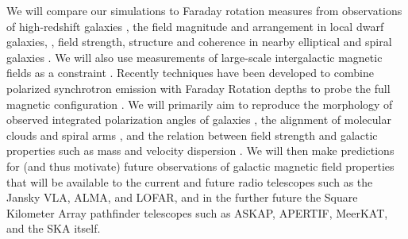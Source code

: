 We will compare our simulations to Faraday rotation measures from
observations of high-redshift galaxies
\cite{2008Natur.454..302B,2008ApJ...676...70K,1998A&A...329..809A},
the field magnitude and arrangement in local dwarf galaxies,
\cite{2000A&A...355..128C,2011A&A...529A..94C,2012MNRAS.423L.127R,Mao12,2013MNRAS.435..149N,2014A&A...567A.134J},
field strength, structure and coherence in nearby elliptical
\cite{1993A&ARv...4..449W,1996MNRAS.279..229M} and spiral galaxies
\cite{2014arXiv1411.1386V}.  We will also use measurements of
large-scale intergalactic magnetic fields as a constraint
\cite{2010Sci...328...73N}.   
Recently techniques have been developed to combine polarized synchrotron
emission with Faraday Rotation depths to probe the full magnetic configuration
\citep{Heald09, Mao15}.
We will primarily aim to reproduce the morphology of observed integrated
polarization angles of galaxies \citep{Stil09}, the alignment of molecular
clouds and spiral arms \citep{2011Natur.479..499L}, and the relation between
field strength and galactic properties such as mass and velocity dispersion
\citep{2014arXiv1411.1386V,Tabatabaei16}.
We will then make predictions for (and thus
motivate) future observations of galactic magnetic field properties that will be
available to the current and future radio telescopes such as the Jansky VLA, ALMA, and LOFAR, and in the
further future the Square Kilometer Array pathfinder telescopes such
as ASKAP, APERTIF, MeerKAT, and
the SKA itself.

